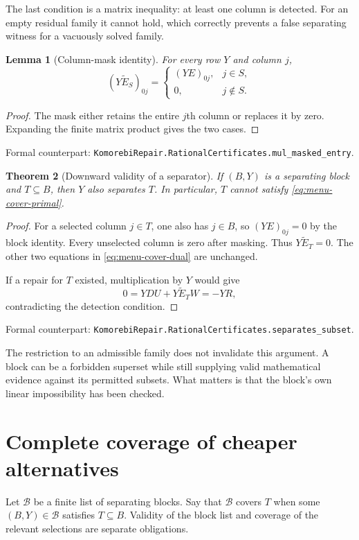 \documentclass[11pt,letterpaper,oneside,openany]{book}
\theoremstyle{quiet}
\newtheorem{theorem}{Theorem}[chapter]
\newtheorem{lemma}[theorem]{Lemma}
\newcommand{\formal}[1]{\par\nobreak\begingroup\footnotesize\color{Slate}\sffamily Formal counterpart: \normalfont\nolinkurl{#1}.\par\endgroup}
\begin{document}
The last condition is a matrix inequality: at least one column is detected. For an empty residual family it cannot hold, which correctly prevents a false separating witness for a vacuously solved family.

\begin{lemma}[Column-mask identity]
For every row $Y$ and column $j$,
\[
 (Y\widetilde E_S)_{0j}=
 \begin{cases}
 (YE)_{0j},&j\in S,\\
 0,&j\notin S.
 \end{cases}
\]
\end{lemma}
\begin{proof}
The mask either retains the entire $j$th column or replaces it by zero. Expanding the finite matrix product gives the two cases.
\end{proof}
\formal{KomorebiRepair.RationalCertificates.mul_masked_entry}

\begin{theorem}[Downward validity of a separator]
If $(B,Y)$ is a separating block and $T\subseteq B$, then $Y$ also separates $T$. In particular, $T$ cannot satisfy \eqref{eq:menu-cover-primal}.
\end{theorem}
\begin{proof}
For a selected column $j\in T$, one also has $j\in B$, so $(YE)_{0j}=0$ by the block identity. Every unselected column is zero after masking. Thus $Y\widetilde E_T=0$. The other two equations in \eqref{eq:menu-cover-dual} are unchanged.

If a repair for $T$ existed, multiplication by $Y$ would give
\[
 0=YDU+Y\widetilde E_TW=-YR,
\]
contradicting the detection condition.
\end{proof}
\formal{KomorebiRepair.RationalCertificates.separates_subset}

The restriction to an admissible family does not invalidate this argument. A block can be a forbidden superset while still supplying valid mathematical evidence against its permitted subsets. What matters is that the block's own linear impossibility has been checked.

\section{Complete coverage of cheaper alternatives}

Let $\mathcal B$ be a finite list of separating blocks. Say that $\mathcal B$ covers $T$ when some $(B,Y)\in\mathcal B$ satisfies $T\subseteq B$. Validity of the block list and coverage of the relevant selections are separate obligations.
\end{document}
